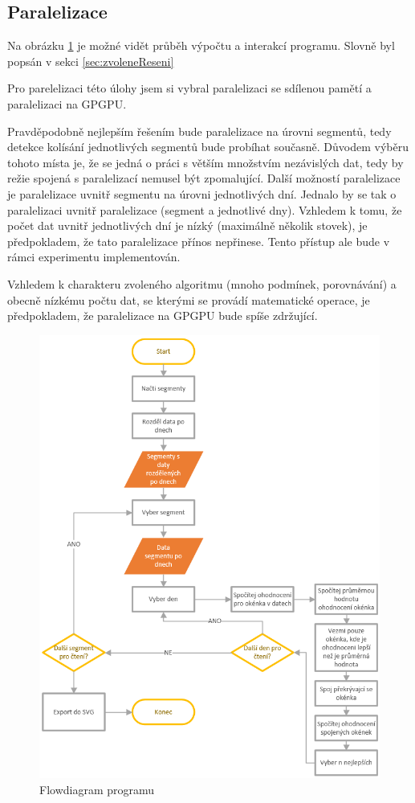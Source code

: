 \documentclass{article}
\begin{document}
	\subsection{Paralelizace}
	 Na obrázku \ref{fig:flowdiagram} je možné vidět průběh výpočtu a interakcí programu. Slovně byl popsán v sekci \ref{sec:zvoleneReseni}
	 
	Pro parelelizaci této úlohy jsem si vybral paralelizaci se sdílenou pamětí a paralelizaci na GPGPU.
	
	Pravděpodobně nejlepším řešením bude paralelizace na úrovni segmentů, tedy detekce kolísání jednotlivých segmentů bude probíhat současně. Důvodem výběru tohoto místa je, že se jedná o práci s větším množstvím nezávislých dat, tedy by režie spojená s paralelizací nemusel být zpomalující.
	Další možností paralelizace je paralelizace uvnitř segmentu na úrovni jednotlivých dní. Jednalo by se tak o paralelizaci uvnitř paralelizace (segment a jednotlivé dny). Vzhledem k tomu, že počet dat uvnitř jednotlivých dní je nízký (maximálně několik stovek), je předpokladem, že tato paralelizace přínos nepřinese. Tento přístup ale bude v rámci experimentu implementován.
	
	Vzhledem k charakteru zvoleného algoritmu (mnoho podmínek, porovnávání) a obecně nízkému počtu dat, se kterými se provádí matematické operace, je předpokladem, že paralelizace na GPGPU bude spíše zdržující.
	
	
\begin{figure}
	\centering
	\includegraphics[width=0.7\linewidth]{flowDiagram}
	\caption[Flowdiagram programu]{Flowdiagram programu}
	\label{fig:flowdiagram}
\end{figure}
\end{document}
